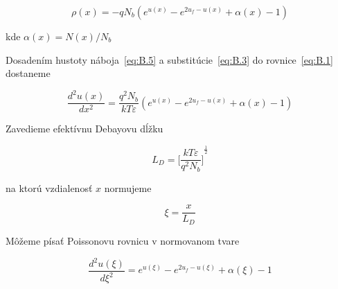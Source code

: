 \begin{equation}\label{eq:B.5}
  \rho(x) = -qN_b(e^{u(x)} - e^{2u_f-u(x)} + \alpha(x) - 1)
\end{equation}

kde $\alpha(x) = {N(x)}/{N_b}$

Dosadením hustoty náboja~\ref{eq:B.5} a substitúcie~\ref{eq:B.3} do rovnice~\ref{eq:B.1} dostaneme

\begin{equation}\label{eq:B.6}
  \frac{d^{2}u(x)}{dx^2} = \frac{q^2N_b}{kT\varepsilon}(e^{u(x)} - e^{2u_f-u(x)} + \alpha(x) - 1)
\end{equation}

Zavedieme efektívnu Debayovu dĺžku

\begin{equation}\label{eq:B.7}
  L_D = {\Bigg[\frac{kT\varepsilon}{q^{2}N_b}\Bigg]}^{\frac{1}{2}}
\end{equation}

na ktorú vzdialenosť $x$ normujeme

\begin{equation}\label{eq:B.8}
  \xi = \frac{x}{L_D}
\end{equation}

Môžeme písať Poissonovu rovnicu v normovanom tvare

\begin{equation}\label{eq:B.9}
  \frac{d^{2}u(\xi)}{d\xi^2} = e^{u(\xi)} - e^{2u_f-u(\xi)} + \alpha(\xi) - 1
\end{equation}
